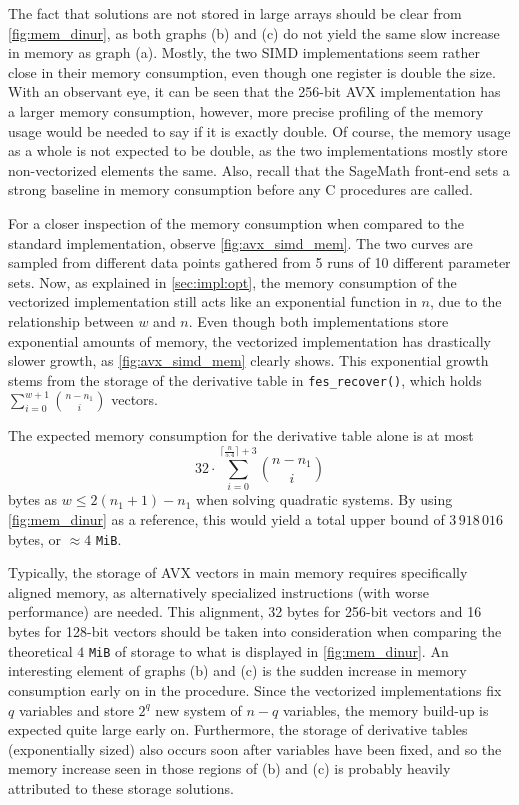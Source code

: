 The fact that solutions are not stored in large arrays should be clear from \cref{fig:mem_dinur}, as both graphs (b) and (c) do not yield the same slow increase in memory as graph (a). Mostly, the two SIMD implementations seem rather close in their memory consumption, even though one register is double the size. With an observant eye, it can be seen that the 256-bit AVX implementation has a larger memory consumption, however, more precise profiling of the memory usage would be needed to say if it is exactly double. Of course, the memory usage as a whole is not expected to be double, as the two implementations mostly store non-vectorized elements the same. Also, recall that the SageMath front-end sets a strong baseline in memory consumption before any C procedures are called. 

For a closer inspection of the memory consumption when compared to the standard implementation, observe \cref{fig:avx_simd_mem}. The two curves are sampled from different data points gathered from 5 runs of 10 different parameter sets. Now, as explained in \cref{sec:impl:opt}, the memory consumption of the vectorized implementation still acts like an exponential function in $n$, due to the relationship between $w$ and $n$. Even though both implementations store exponential amounts of memory, the vectorized implementation has drastically slower growth, as \cref{fig:avx_simd_mem} clearly shows. This exponential growth stems from the storage of the derivative table in \texttt{fes\_recover()}, which holds $\sum_{i = 0}^{w + 1} \binom{n - n_1}{i}$ vectors.

The expected memory consumption for the derivative table alone is at most 
$$
    32 \cdot \sum_{i = 0}^{\lceil \frac{n}{5.4} \rceil + 3} \binom{n - n_1}{i}
$$
bytes as $w \leq 2 (n_1 + 1) - n_1$ when solving quadratic systems. By using \cref{fig:mem_dinur} as a reference, this would yield a total upper bound of $3\,918\,016$ bytes, or $\approx 4$ \texttt{MiB}. 

Typically, the storage of AVX vectors in main memory requires specifically aligned memory, as alternatively specialized instructions (with worse performance) are needed. This alignment, 32 bytes for 256-bit vectors and 16 bytes for 128-bit vectors should be taken into consideration when comparing the theoretical $4$ \texttt{MiB} of storage to what is displayed in \cref{fig:mem_dinur}. An interesting element of graphs (b) and (c) is the sudden increase in memory consumption early on in the procedure. Since the vectorized implementations fix $q$ variables and store $2^q$ new system of $n - q$ variables, the memory build-up is expected quite large early on. Furthermore, the storage of derivative tables (exponentially sized) also occurs soon after variables have been fixed, and so the memory increase seen in those regions of (b) and (c) is probably heavily attributed to these storage solutions. 

